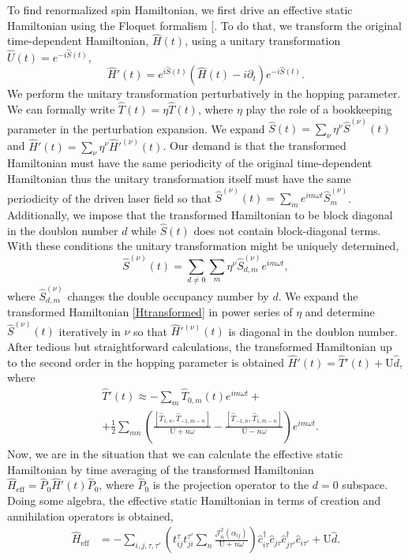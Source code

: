 \documentclass[aps,prl,twocolumn,amsmath,amssymb,nobibnotes]{revtex4-1}%
\renewcommand{\cite}[1]{{[}\onlinecite{#1}{]}}
\newcommand{\n}{\nonumber}
\begin{document}
To find renormalized spin Hamiltonian, we first drive an effective static Hamiltonian using the Floquet formalism \cite{Floquet1,2018NJPh...20i3022R,Floquet2}. To do that, we transform the original time-dependent Hamiltonian, $\hat{H}(t)$, using a unitary transformation $\hat{U}(t) = e^{-i\hat{S}(t)}$,
\begin{equation}
\hat{H}'(t) = e^{i\hat{S}(t)} \left(\hat{H}(t)  -  i\partial_t \right) e^{-i\hat{S}(t)}.
\label{Htransformed}
\end{equation}
We perform the unitary transformation perturbatively in the hopping parameter. We can formally write $\hat{T}(t) = \eta \hat{T}(t)$, where $\eta$ play the role of a bookkeeping parameter in the perturbation expansion. We expand $\hat{S}(t) = \sum_\nu \eta^\nu \hat{S}^{(\nu)}(t)$ and $\hat{H}'(t) = \sum_\nu \eta^\nu \hat{H}'^{(\nu)}(t)$. Our demand is that the transformed Hamiltonian must have the same periodicity of the original time-dependent Hamiltonian thus the unitary transformation itself must have the same periodicity of the driven laser field so that $\hat{S}^{(\nu)}(t) = \sum_m e^{im\omega t}\hat{S}^{(\nu)}_m$. Additionally, we impose that the transformed Hamiltonian to be block diagonal in the doublon number $d$ while $\hat{S}(t)$ does not contain block-diagonal terms. With these conditions the unitary transformation might be uniquely determined,
\begin{equation}
\hat{S}^{(\nu)}(t) = \sum_{d \neq 0} \sum_m \eta^\nu \hat{S}^{(\nu)}_{d,m} e^{im\omega t},
\end{equation}
where $\hat{S}^{(\nu)}_{d,m}$ changes the double occupancy number by $d$. We expand the transformed Hamiltonian \ref{Htransformed} in power series of $\eta$ and determine $\hat{S}^{(\nu)}(t)$ iteratively in $\nu$ so that $\hat{H}'^{(\nu)}(t)$ is diagonal in the doublon number. After tedious but straightforward calculations, the transformed Hamiltonian up to the second order in the hopping parameter is obtained $\hat{H}'(t)= \hat{T}'(t)+\text{U}\hat{d}$, where
\begin{align}
\label{transformedH}
&\hat{T}'(t) \approx  - \sum_m \hat{T}_{0,m}(t)e^{im\omega t} + \n \\
&+ \frac{1}{2}\sum_{mn} \left( \frac{\left[\hat{T}_{1,n}, \hat{T}_{-1,m-n} \right]}{\text{U}+n\omega} - \frac{\left[\hat{T}_{-1,n}, \hat{T}_{1,m-n} \right]}{\text{U}-n\omega} \right) e^{im\omega t}.
\end{align}
Now, we are in the situation that we can calculate the effective static Hamiltonian by time averaging of the transformed Hamiltonian $\hat{H}_{\text{eff}}=\hat{P}_0\hat{H}'(t)\hat{P}_0$, where $\hat{P}_0$ is the projection operator to the $d=0$ subspace.
Doing some algebra, the effective static Hamiltonian in terms of creation and annihilation operators is obtained,
\begin{align}
\hat{H}_{\text{eff}} &= - \sum_{i,j, \tau, \tau'} \left(t_{ij}^{\tau} t_{ji}^{\tau'} \sum_{n} \frac{\mathcal{J}_{n}^2(\alpha_{ij})}{\text{U}+n\omega} \right)  \hat{c}_{i \tau}^\dagger \hat{c}_{j \tau} \hat{c}_{j \tau'}^\dagger \hat{c}_{i \tau'}+\text{U}\hat{d}. \label{GeneralHeff}
\end{align}
\end{document}

